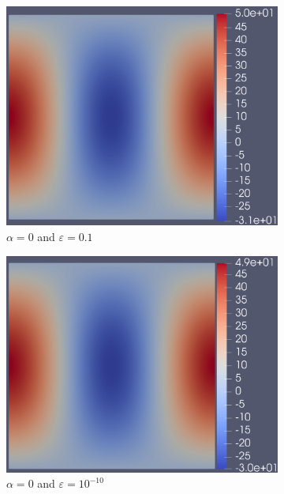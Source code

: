\documentclass[12pt]{ociamthesis}
\begin{document}
\begin{figure}[H]
 \begin{subfigure}{0.44\textwidth}
     \includegraphics[width=\textwidth]{Pics/uf/F_E1a_eps1.png}
     \caption{$\alpha=0$ and $\varepsilon = 0.1$}
 \end{subfigure}
   \begin{subfigure}{0.44\textwidth}
     \includegraphics[width=\textwidth]{Pics/uf/F_E1a_eps10.png}
     \caption{$\alpha=0$ and $\varepsilon = 10^{-10}$}
 \end{subfigure}
 \begin{subfigure}{0.44\textwidth}

\end{subfigure}
\end{figure}
\end{document}
